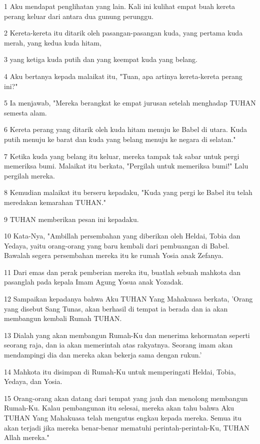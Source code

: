 \par 1 Aku mendapat penglihatan yang lain. Kali ini kulihat empat buah kereta perang keluar dari antara dua gunung perunggu.
\par 2 Kereta-kereta itu ditarik oleh pasangan-pasangan kuda, yang pertama kuda merah, yang kedua kuda hitam,
\par 3 yang ketiga kuda putih dan yang keempat kuda yang belang.
\par 4 Aku bertanya kepada malaikat itu, "Tuan, apa artinya kereta-kereta perang ini?"
\par 5 Ia menjawab, "Mereka berangkat ke empat jurusan setelah menghadap TUHAN semesta alam.
\par 6 Kereta perang yang ditarik oleh kuda hitam menuju ke Babel di utara. Kuda putih menuju ke barat dan kuda yang belang menuju ke negara di selatan."
\par 7 Ketika kuda yang belang itu keluar, mereka tampak tak sabar untuk pergi memeriksa bumi. Malaikat itu berkata, "Pergilah untuk memeriksa bumi!" Lalu pergilah mereka.
\par 8 Kemudian malaikat itu berseru kepadaku, "Kuda yang pergi ke Babel itu telah meredakan kemarahan TUHAN."
\par 9 TUHAN memberikan pesan ini kepadaku.
\par 10 Kata-Nya, "Ambillah persembahan yang diberikan oleh Heldai, Tobia dan Yedaya, yaitu orang-orang yang baru kembali dari pembuangan di Babel. Bawalah segera persembahan mereka itu ke rumah Yosia anak Zefanya.
\par 11 Dari emas dan perak pemberian mereka itu, buatlah sebuah mahkota dan pasanglah pada kepala Imam Agung Yosua anak Yozadak.
\par 12 Sampaikan kepadanya bahwa Aku TUHAN Yang Mahakuasa berkata, 'Orang yang disebut Sang Tunas, akan berhasil di tempat ia berada dan ia akan membangun kembali Rumah TUHAN.
\par 13 Dialah yang akan membangun Rumah-Ku dan menerima kehormatan seperti seorang raja, dan ia akan memerintah atas rakyatnya. Seorang imam akan mendampingi dia dan mereka akan bekerja sama dengan rukun.'
\par 14 Mahkota itu disimpan di Rumah-Ku untuk memperingati Heldai, Tobia, Yedaya, dan Yosia.
\par 15 Orang-orang akan datang dari tempat yang jauh dan menolong membangun Rumah-Ku. Kalau pembangunan itu selesai, mereka akan tahu bahwa Aku TUHAN Yang Mahakuasa telah mengutus engkau kepada mereka. Semua itu akan terjadi jika mereka benar-benar mematuhi perintah-perintah-Ku, TUHAN Allah mereka."

